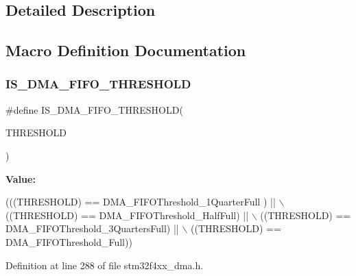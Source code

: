 \subsection{Detailed Description}


\subsection{Macro Definition Documentation}
\mbox{\label{group___d_m_a__fifo__threshold__level_gaeafc0d9e327d6e5b26cd37f6744b232f}} 
\subsubsection{\texorpdfstring{I\+S\+\_\+\+D\+M\+A\+\_\+\+F\+I\+F\+O\+\_\+\+T\+H\+R\+E\+S\+H\+O\+LD}{IS\_DMA\_FIFO\_THRESHOLD}}
{\footnotesize\ttfamily \#define I\+S\+\_\+\+D\+M\+A\+\_\+\+F\+I\+F\+O\+\_\+\+T\+H\+R\+E\+S\+H\+O\+LD(\begin{DoxyParamCaption}\item[{}]{T\+H\+R\+E\+S\+H\+O\+LD }\end{DoxyParamCaption})}

{\bfseries Value\+:}
\begin{DoxyCode}
(((THRESHOLD) == DMA\_FIFOThreshold\_1QuarterFull ) || \(\backslash\)
                                          ((THRESHOLD) == DMA\_FIFOThreshold\_HalfFull)      || \(\backslash\)
                                          ((THRESHOLD) == DMA\_FIFOThreshold\_3QuartersFull) || \(\backslash\)
                                          ((THRESHOLD) == DMA\_FIFOThreshold\_Full))
\end{DoxyCode}


Definition at line 288 of file stm32f4xx\+\_\+dma.\+h.

